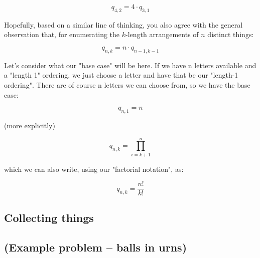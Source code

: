\begin{equation*}
q_{4,2} = 4 \cdot q_{3,1}
\end{equation*}

Hopefully, based on a similar line of thinking, you also agree with the general observation that, for enumerating the $k$-length arrangements of $n$ distinct things:

\begin{equation*}
q_{n,k} = n \cdot q_{n-1,k-1}
\end{equation*}

Let's consider what our "base case" will be here. If we have n letters available and a "length 1" ordering, we just choose a letter and have that be our "length-1 ordering". There are of course n letters we can choose from, so we have the base case: 

\begin{equation*}
q_{n,1} = n
\end{equation*}



(more explicitly)

\begin{equation*}
q_{n,k} = \prod_{i=k+1}^n
\end{equation*}


which we can also write, using our "factorial notation", as:

\begin{equation}
q_{n,k} = \frac{n!}{k!}
\end{equation}







\subsection{Collecting things}




\subsection{(Example problem -- balls in urns)}

